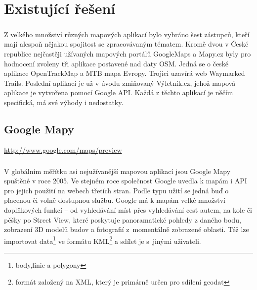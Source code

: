 \documentclass[11pt,a4paper,titlepage,oneside]{book}
\begin{document}
\pagestyle{fancy}

\chapter{Existující řešení}
	\label{sec:Ex_reseni}
	\paragraph{} Z velkého množství různých mapových aplikací bylo vybráno šest zástupců, kteří mají alespoň nějakou spojitost se zpracovávaným tématem. Kromě dvou v České republice nejčastěji užívaných mapových portálů GoogleMaps a Mapy.cz byly pro hodnocení zvoleny tři aplikace postavené nad daty \ac{OSM}. Jedná se o české aplikace OpenTrackMap a MTB mapa Evropy. Trojici uzavírá web Waymarked Trails. Poslední aplikací je už v úvodu zmiňovaný Výletník.cz, jehož mapová aplikace je vytvořena pomocí Google \ac{API}. Každá z těchto aplikací je něčím specifická, má své výhody i nedostatky. 
	\section{Google Mapy}
		\url{http://www.google.com/maps/preview}

                

		\paragraph{} V globálním měřítku asi nejužívanější mapovou aplikací jsou Google Mapy spuštěné v roce 2005. Ve stejném roce společnost Google uvedla k mapám i \ac{API} pro jejich použití na webech třetích stran. Podle typu užití se jedná buď o placenou či volně dostupnou službu. Google má k mapám velké množství doplňkových funkcí -- od vyhledávání míst přes vyhledávání cest autem, na kole či pěšky po Street View, které poskytuje panoramatické pohledy z daného bodu, zobrazení 3D modelů budov a fotografií z~momentálně zobrazené oblasti. Též lze importovat data\footnote{body,linie a polygony} ve formátu \ac{KML}\footnote{formát založený na \ac{XML}, který je primárně určen pro sdílení geodat} a sdílet je s~jinými uživateli.

\end{document}
